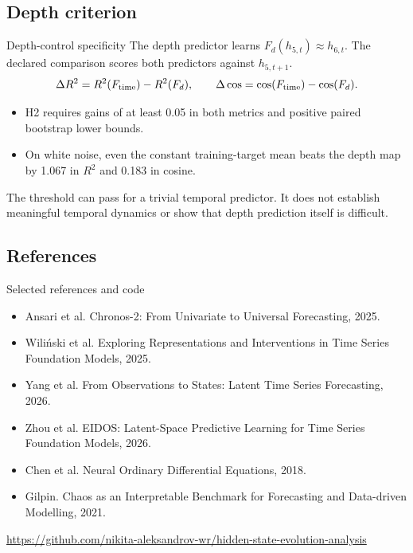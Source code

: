 \documentclass[aspectratio=169,11pt]{beamer}
\begin{document}
\subsection{Depth criterion}
\begin{frame}{Depth-control specificity}
The depth predictor learns $F_d(h_{5,t})\approx h_{6,t}$.
The declared comparison scores both predictors against $h_{5,t+1}$.
\[
 \Delta R^2=R^2(F_{\rm time})-R^2(F_d),\qquad
 \Delta\cos=\cos(F_{\rm time})-\cos(F_d).
\]
\begin{itemize}
\item H2 requires gains of at least 0.05 in both metrics and positive paired bootstrap lower bounds.
\item On white noise, even the constant training-target mean beats the depth map by 1.067 in $R^2$ and 0.183 in cosine.
\end{itemize}
\vspace{3mm}
The threshold can pass for a trivial temporal predictor. It does not establish meaningful temporal dynamics or show that depth prediction itself is difficult.
\end{frame}

\subsection{References}
\begin{frame}{Selected references and code}
\small
\begin{itemize}
\item Ansari et al. Chronos-2: From Univariate to Universal Forecasting, 2025.
\item Wili\'nski et al. Exploring Representations and Interventions in Time Series Foundation Models, 2025.
\item Yang et al. From Observations to States: Latent Time Series Forecasting, 2026.
\item Zhou et al. EIDOS: Latent-Space Predictive Learning for Time Series Foundation Models, 2026.
\item Chen et al. Neural Ordinary Differential Equations, 2018.
\item Gilpin. Chaos as an Interpretable Benchmark for Forecasting and Data-driven Modelling, 2021.
\end{itemize}
\vspace{2mm}
\scriptsize
\url{https://github.com/nikita-aleksandrov-wr/hidden-state-evolution-analysis}
\end{frame}
\end{document}
